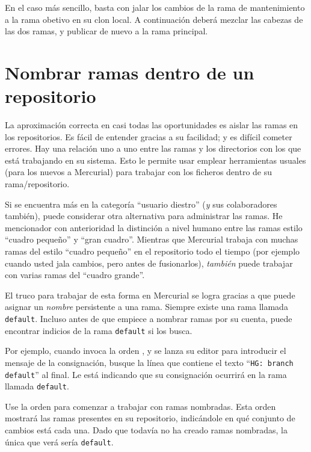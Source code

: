En el caso más sencillo, basta con jalar los cambios de la rama de
mantenimiento a la rama obetivo en su clon local.
A continuación deberá mezclar las cabezas de las dos ramas, y publicar
de nuevo a la rama principal.

\section{Nombrar ramas dentro de un repositorio}

La aproximación correcta en casi todas las oportunidades es aislar las
ramas en los repositorios.  Es fácil de entender gracias a su
facilidad; y es difícil cometer errores. Hay una relación uno a uno
entre las ramas y los directorios con los que está trabajando en su
sistema. Esto le permite usar emplear herramientas usuales (para los
nuevos a Mercurial) para trabajar con los ficheros dentro de su
rama/repositorio.

Si se encuentra más en la categoría ``usuario diestro'' (\emph{y} sus
colaboradores también), puede considerar otra alternativa para
administrar las ramas. He mencionador con anterioridad la distinción a
nivel humano entre las ramas estilo ``cuadro pequeño'' y ``gran
cuadro''.  Mientras que Mercurial trabaja con muchas ramas del estilo
``cuadro pequeño'' en el repositorio todo el tiempo (por ejemplo cuando
usted jala cambios, pero antes de fusionarlos), \emph{también} puede
trabajar con varias ramas del ``cuadro grande''.

El truco para trabajar de esta forma en Mercurial se logra gracias a
que puede asignar un \emph{nombre} persistente a una rama.  Siempre
existe una rama llamada \texttt{default}.  Incluso antes de que
empiece a nombrar ramas por su cuenta, puede encontrar indicios de la
rama \texttt{default} si los busca.

Por ejemplo, cuando invoca la orden , y se lanza su
editor para introducir el mensaje de la consignación, busque la línea
que contiene el texto ``\texttt{HG: branch default}'' al final. Le
está indicando que su consignación ocurrirá en la rama llamada 
\texttt{default}.

Use la orden  para comenzar a trabajar con ramas
nombradas. Esta orden mostrará las ramas presentes en su repositorio,
indicándole en qué conjunto de cambios está cada una.
Dado que todavía no ha creado ramas nombradas, la única que verá sería
\texttt{default}.

